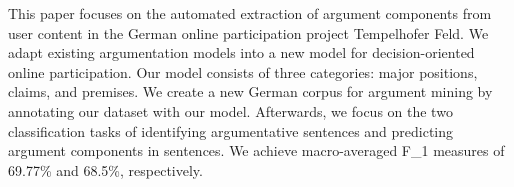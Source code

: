 This paper focuses on the automated extraction of argument components from user content in the German online participation project Tempelhofer Feld. We adapt existing argumentation models into a new model for decision-oriented online participation. Our model consists of three categories: major positions, claims, and premises. We create a new German corpus for argument mining by annotating our dataset with our model. Afterwards, we focus on the two classification tasks of identifying argumentative sentences and predicting argument components in sentences. We achieve macro-averaged F\_1 measures of 69.77\% and 68.5\%, respectively.

